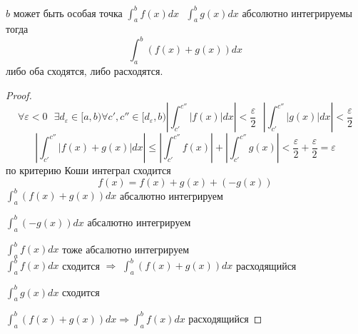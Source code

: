 \begin{theorem}
  $b$ может быть особая точка $\int_a^b f(x)dx ~~~ \int_a^b g(x)dx$
абсолютно интегрируемы тогда
  $$
  \int_a^b (f(x) + g(x)) dx
  $$
  либо оба сходятся, либо расходятся.
\end{theorem}

\begin{proof}
  $$
  \forall \varepsilon < 0 ~~~ \exists d_{\varepsilon} \in [a,b)
  \forall c', c'' \in [d_{\varepsilon}, b)
  \left| \int_{c'}^{c''} |f(x)|dx \right| < \frac{\varepsilon}{2} ~~~
  \left| \int_{c'}^{c''} |g(x)|dx \right| < \frac{\varepsilon}{2}
  $$
  $$
  \left| \int_{c'}^{c''} |f(x) + g(x)| dx \right| \le
  \left| \int_{c'}^{c''} f(x) \right| + \left| \int_{c'}^{c''} g(x) \right|
  < \frac{\varepsilon}{2} + \frac{\varepsilon}{2} = \varepsilon
  $$
  по критерию Коши интеграл сходится
  $$
  f(x) = f(x) + g(x) + (-g(x))
  $$
  $\int_a^b (f(x) + g(x)) dx$ абсалютно интегрируем

  $\int_a^b (-g(x)) dx$ абсалютно интегрируем

  $\int_a^b f(x) dx$ тоже абсалютно интегрируем\\

  $\int_a^b f(x)dx$ сходится $\Rightarrow$ $\int_a^b (f(x) + g(x)) dx$
  расходящийся

  $\int_a^b g(x) dx$ сходится

  $\int_a^b (f(x) + g(x)) dx \Rightarrow \int_a^b f(x) dx$ расходящийся
\end{proof}